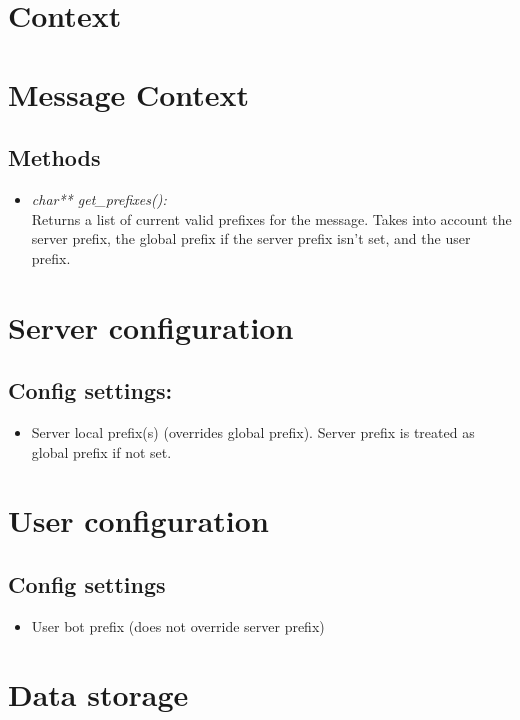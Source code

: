 \documentclass[a4paper]{amsart}
\begin{document}
\section{Context}
\section{Message Context}
\subsection{Methods}
    \begin{itemize}
        \item \textit{char** get\_prefixes():}\\
            Returns a list of current valid prefixes for the message. Takes into account the server prefix, the global prefix if the server prefix isn't set, and the user prefix.
    \end{itemize}

\section{Server configuration}
\subsection{Config settings:}
\begin{itemize}
    \item Server local prefix(s) (overrides global prefix). Server prefix is treated as global prefix if not set.
\end{itemize}

\section{User configuration}
\subsection{Config settings}
\begin{itemize}
    \item User bot prefix (does not override server prefix)
\end{itemize}

\section{Data storage}
\end{document}
